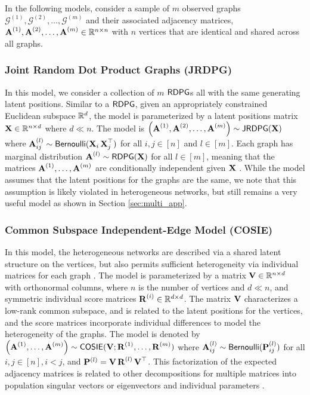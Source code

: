 In the following models, consider a sample of $m$ observed graphs $\mathcal{G}^{(1)}, \mathcal{G}^{(2)}, \ldots, \mathcal{G}^{(m)}$  and their associated adjacency matrices, $\operatorname{\mathbf{A}}^{(1)}, \operatorname{\mathbf{A}}^{(2)}, \ldots, \operatorname{\mathbf{A}}^{(m)}\in\mathbb{R}^{n\times n}$ with $n$ vertices that are identical and shared across all graphs. 

\subsubsection{Joint Random Dot Product Graphs (JRDPG)}
In this model, we consider a collection of $m$ $\operatorname{\mathsf{RDPG}}$s all with the same generating latent positions. Similar to a $\operatorname{\mathsf{RDPG}}$, given an appropriately constrained Euclidean subspace $\mathbb{R}^d$, the model is parameterized by a latent positions matrix $\operatorname{\mathbf{X}}\in\mathbb{R}^{n\times d}$ where $d \ll n$. The model is $\left(\operatorname{\mathbf{A}}^{(1)}, \operatorname{\mathbf{A}}^{(2)}, \ldots, \operatorname{\mathbf{A}}^{(m)}\right)\sim \operatorname{\mathsf{JRDPG}}(\operatorname{\mathbf{X}})$ where $\operatorname{\mathbf{A}}_{ij}^{(l)}\sim \operatorname{\mathsf{Bernoulli}}(\operatorname{\mathbf{X}}_i\operatorname{\mathbf{X}}_j^\top)$ for all $i, j \in [n]$ and $l\in [m]$. Each graph has marginal distribution $\operatorname{\mathbf{A}}^{(l)}\sim\operatorname{\mathsf{RDPG}}(\operatorname{\mathbf{X}})$ for all $l \in [m]$, meaning that the matrices $\operatorname{\mathbf{A}}^{(1)}, \ldots,\operatorname{\mathbf{A}}^{(m)}$ are conditionally independent given $\operatorname{\mathbf{X}}$ \cite{athreya2017statistical,levin2017central}. While the model assumes that the latent positions for the graphs are the same, we note that this assumption is likely violated in heterogeneous networks, but still remains a very useful model as shown in Section \ref{sec:multi_app}.

\subsubsection{Common Subspace Independent-Edge Model (COSIE)} \label{sec:cosie}
In this model, the heterogeneous networks are described via a shared latent structure on the vertices, but also permits sufficient heterogeneity via individual matrices for each graph  \cite{arroyo2019inference}.
The model is parameterized by a  matrix $\operatorname{\mathbf{V}}\in\mathbb{R}^{n\times d}$ with orthonormal columns, 
where $n$ is the number of vertices and $d\ll n$, and  symmetric individual score matrices $\operatorname{\mathbf{R}}^{(i)}\in\mathbb{R}^{d\times d}$. The matrix $\operatorname{\mathbf{V}}$ characterizes a low-rank common subspace, and is related to the latent positions for the vertices, and the score matrices incorporate individual differences to model the heterogeneity of the graphs. The model is denoted by $\left(\operatorname{\mathbf{A}}^{(1)}, \ldots, \operatorname{\mathbf{A}}^{(m)}\right)\sim \operatorname{\mathsf{COSIE}}(\operatorname{\mathbf{V}}; \operatorname{\mathbf{R}}^{(1)}, \ldots, \operatorname{\mathbf{R}}^{(m)})$ where $\operatorname{\mathbf{A}}_{ij}^{(l)} \sim \operatorname{\mathsf{Bernoulli}}(\mathbf{P}^{(l)}_{ij})$ for all $i, j\in [n], i < j$, and $\mathbf{P}^{(l)}=\operatorname{\mathbf{V}}\operatorname{\mathbf{R}}^{(l)}\operatorname{\mathbf{V}}^\top$. This factorization of the expected adjacency matrices is related to other decompositions for multiple matrices into population singular vectors or eigenvectors and individual parameters \cite{afshin2012enhancing,crainiceanu2011population,lock2013joint,wang2019common}.


